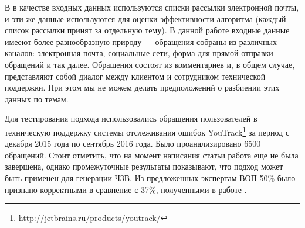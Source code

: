 В \cite{original} в качестве входных данных используются списки рассылки электронной почты, и эти же данные используются для оценки эффективности алгоритма (каждый список рассылки принят за отдельную тему). В данной работе входные данные имееют более разнообразную природу --- обращения собраны из различных каналов: электронная почта, социальные сети, форма для прямой отправки обращений и так далее. Обращения состоят из комментариев и, в общем случае, представляют собой диалог между клиентом и сотрудником технической поддержки. При этом мы не можем делать предположений о разбиении этих данных по темам.

Для тестирования подхода использовались обращения пользователей в техническую поддержку системы отслеживания ошибок YouTrack\footnote{http://jetbrains.ru/products/youtrack/} за период с декабря 2015 года по сентябрь 2016 года. Было проанализировано 6500 обращений. Стоит отметить, что на момент написания статьи работа еще не была завершена, однако промежуточные результаты показывают, что подход может быть применен для генерации ЧЗВ. Из предложенных экспертам ВОП 50\% было признано корректными в сравнение с 37\%, полученными в работе \cite{original}.
